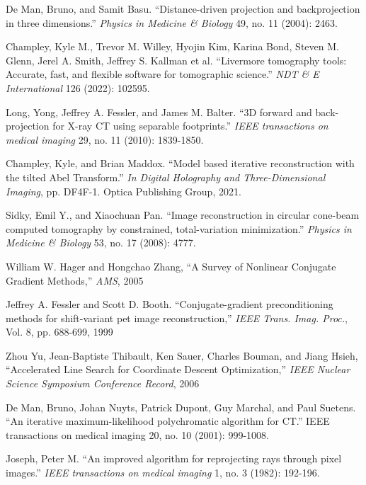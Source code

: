 \documentclass[11pt]{article}
\begin{document}


\begin{thebibliography}{100}

 De Man, Bruno, and Samit Basu. ``Distance-driven projection and backprojection in three dimensions.'' \emph{Physics in Medicine \& Biology} 49, no. 11 (2004): 2463.

 Champley, Kyle M., Trevor M. Willey, Hyojin Kim, Karina Bond, Steven M. Glenn, Jerel A. Smith, Jeffrey S. Kallman et al. ``Livermore tomography tools: Accurate, fast, and flexible software for tomographic science.'' \emph{NDT \& E International} 126 (2022): 102595.

 Long, Yong, Jeffrey A. Fessler, and James M. Balter. ``3D forward and back-projection for X-ray CT using separable footprints.'' \emph{IEEE transactions on medical imaging} 29, no. 11 (2010): 1839-1850.

 Champley, Kyle, and Brian Maddox. ``Model based iterative reconstruction with the tilted Abel Transform.'' \emph{In Digital Holography and Three-Dimensional Imaging}, pp. DF4F-1. Optica Publishing Group, 2021.

 Sidky, Emil Y., and Xiaochuan Pan. ``Image reconstruction in circular cone-beam computed tomography by constrained, total-variation minimization.'' \emph{Physics in Medicine \& Biology} 53, no. 17 (2008): 4777.

 William W. Hager and Hongchao Zhang, ``A Survey of Nonlinear Conjugate Gradient Methods,'' \emph{AMS}, 2005

Jeffrey A. Fessler and Scott D. Booth. ``Conjugate-gradient preconditioning methods for shift-variant pet image reconstruction,'' \emph{IEEE Trans. Imag. Proc.}, Vol. 8, pp. 688-699, 1999

 Zhou Yu, Jean-Baptiste Thibault, Ken Sauer, Charles Bouman, and Jiang Hsieh, ``Accelerated Line Search for Coordinate Descent
Optimization,'' \emph{IEEE Nuclear Science Symposium Conference Record}, 2006

 De Man, Bruno, Johan Nuyts, Patrick Dupont, Guy Marchal, and Paul Suetens. ``An iterative maximum-likelihood polychromatic algorithm for CT.'' IEEE transactions on medical imaging 20, no. 10 (2001): 999-1008.

 Joseph, Peter M. ``An improved algorithm for reprojecting rays through pixel images.'' \emph{IEEE transactions on medical imaging} 1, no. 3 (1982): 192-196.


\end{thebibliography}
\end{document}
